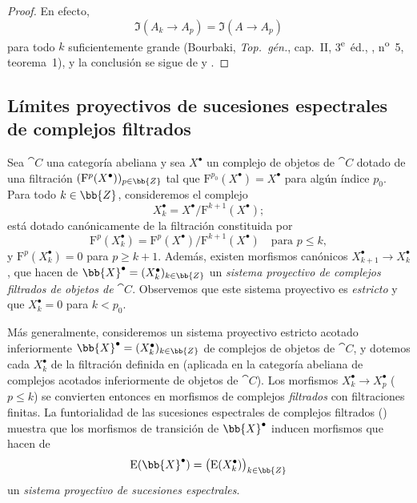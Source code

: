 \documentclass[oneside]{amsart}
\renewcommand{\leq}{\leqslant}
\renewcommand{\geq}{\geqslant}
\let\EGAOriginalLabel\label
\renewcommand{\label}[1]{\phantomsection\EGAOriginalLabel{#1}}
\begin{document}
\begin{proof}
En efecto,
\[
  \Im(A_k\longrightarrow A_p)
  =
  \Im(A\longrightarrow A_p)
\]
para todo $k$ suficientemente grande
(Bourbaki, \emph{Top.\ g\'{e}n.}, cap.~II,
3\textsuperscript{e}~\'{e}d., ,
n\textsuperscript{o}~5, teorema~1), y la conclusión se sigue de
 y .
\end{proof}

\subsection{Límites proyectivos de sucesiones espectrales de complejos filtrados}
\label{subsection:0.13.5}

\begin{env}[13.5.1]
\label{0.13.5.1}
Sea $\cat{C}$ una categoría abeliana y sea $X^\bullet$ un complejo
de objetos de $\cat{C}$ dotado de una filtración
$(\mathrm{F}^p(X^\bullet))_{p\in\bb{Z}}$ tal que
$\mathrm{F}^{p_0}(X^\bullet)=X^\bullet$ para algún índice $p_0$.
Para todo $k\in\bb{Z}$, consideremos el complejo
\[
  X^\bullet_k=X^\bullet/\mathrm{F}^{k+1}(X^\bullet);
\]
está dotado canónicamente de la filtración constituida por
\[
  \mathrm{F}^p(X^\bullet_k)
  =
  \mathrm{F}^p(X^\bullet)/\mathrm{F}^{k+1}(X^\bullet)
  \quad\text{para }p\leq k,
\]
y $\mathrm{F}^p(X^\bullet_k)=0$ para $p\geq k+1$.
Además, existen morfismos canónicos
$X^\bullet_{k+1}\longrightarrow X^\bullet_k$, que hacen de
$\bb{X}^\bullet=(X^\bullet_k)_{k\in\bb{Z}}$ un \emph{sistema proyectivo
de complejos filtrados de objetos de $\cat{C}$}.
Observemos que este sistema proyectivo es \emph{estricto} y que
$X^\bullet_k=0$ para $k<p_0$.
\end{env}

\begin{env}[13.5.2]
\label{0.13.5.2}
Más generalmente, consideremos un sistema proyectivo estricto acotado
inferiormente
$\bb{X}^\bullet=(X^\bullet_k)_{k\in\bb{Z}}$ de complejos de objetos de
$\cat{C}$, y dotemos cada $X^\bullet_k$ de la filtración definida en
 (aplicada en la categoría abeliana de complejos acotados
inferiormente de objetos de $\cat{C}$).
Los morfismos
$X^\bullet_k\longrightarrow X^\bullet_p$ ($p\leq k$) se convierten entonces
en morfismos de complejos \emph{filtrados} con filtraciones finitas.
La funtorialidad de las sucesiones espectrales de complejos filtrados
() muestra que los morfismos de transición de
$\bb{X}^\bullet$ inducen morfismos que hacen de
\[
  \mathrm{E}(\bb{X}^\bullet)
  =
  \bigl(\mathrm{E}(X^\bullet_k)\bigr)_{k\in\bb{Z}}
\]
un \emph{sistema proyectivo de sucesiones espectrales}.
\end{env}
\end{document}
